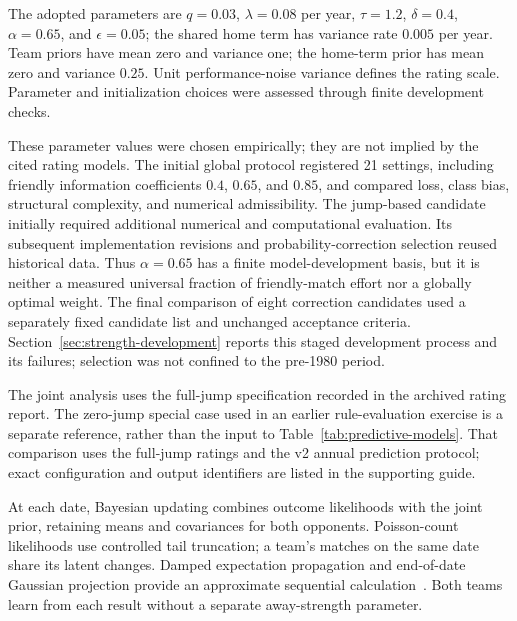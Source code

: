 The adopted parameters are $q=0.03$, $\lambda=0.08$ per year, $\tau=1.2$, $\delta=0.4$, $\alpha=0.65$, and $\epsilon=0.05$; the shared home term has variance rate $0.005$ per year. Team priors have mean zero and variance one; the home-term prior has mean zero and variance $0.25$. Unit performance-noise variance defines the rating scale. Parameter and initialization choices were assessed through finite development checks.

These parameter values were chosen empirically; they are not implied by the cited rating models. The initial global protocol registered 21 settings, including friendly information coefficients $0.4$, $0.65$, and $0.85$, and compared loss, class bias, structural complexity, and numerical admissibility. The jump-based candidate initially required additional numerical and computational evaluation. Its subsequent implementation revisions and probability-correction selection reused historical data. Thus $\alpha=0.65$ has a finite model-development basis, but it is neither a measured universal fraction of friendly-match effort nor a globally optimal weight. The final comparison of eight correction candidates used a separately fixed candidate list and unchanged acceptance criteria. Section~\ref{sec:strength-development} reports this staged development process and its failures; selection was not confined to the pre-1980 period.

The joint analysis uses the full-jump specification recorded in the archived rating report. The zero-jump special case used in an earlier rule-evaluation exercise is a separate reference, rather than the input to Table~\ref{tab:predictive-models}. That comparison uses the full-jump ratings and the v2 annual prediction protocol; exact configuration and output identifiers are listed in the supporting guide.

At each date, Bayesian updating combines outcome likelihoods with the joint prior, retaining means and covariances for both opponents. Poisson-count likelihoods use controlled tail truncation; a team's matches on the same date share its latent changes. Damped expectation propagation and end-of-date Gaussian projection provide an approximate sequential calculation~\cite{minka2001ep}. Both teams learn from each result without a separate away-strength parameter.

